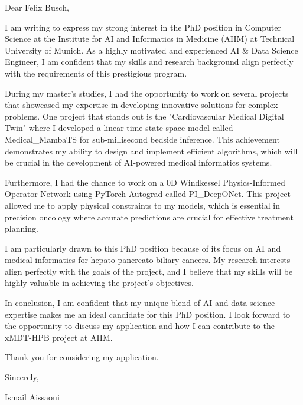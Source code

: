 \documentclass{letter}
\begin{document}
\opening{}

Dear Felix Busch,

I am writing to express my strong interest in the PhD position in Computer Science at the Institute for AI and Informatics in Medicine (AIIM) at Technical University of Munich. As a highly motivated and experienced AI & Data Science Engineer, I am confident that my skills and research background align perfectly with the requirements of this prestigious program.

During my master's studies, I had the opportunity to work on several projects that showcased my expertise in developing innovative solutions for complex problems. One project that stands out is the "Cardiovascular Medical Digital Twin" where I developed a linear-time state space model called Medical_MambaTS for sub-millisecond bedside inference. This achievement demonstrates my ability to design and implement efficient algorithms, which will be crucial in the development of AI-powered medical informatics systems.

Furthermore, I had the chance to work on a 0D Windkessel Physics-Informed Operator Network using PyTorch Autograd called PI_DeepONet. This project allowed me to apply physical constraints to my models, which is essential in precision oncology where accurate predictions are crucial for effective treatment planning.

I am particularly drawn to this PhD position because of its focus on AI and medical informatics for hepato-pancreato-biliary cancers. My research interests align perfectly with the goals of the project, and I believe that my skills will be highly valuable in achieving the project's objectives.

In conclusion, I am confident that my unique blend of AI and data science expertise makes me an ideal candidate for this PhD position. I look forward to the opportunity to discuss my application and how I can contribute to the xMDT-HPB project at AIIM.

Thank you for considering my application.

Sincerely,

Ismail Aissaoui

\closing{}
\end{document}
